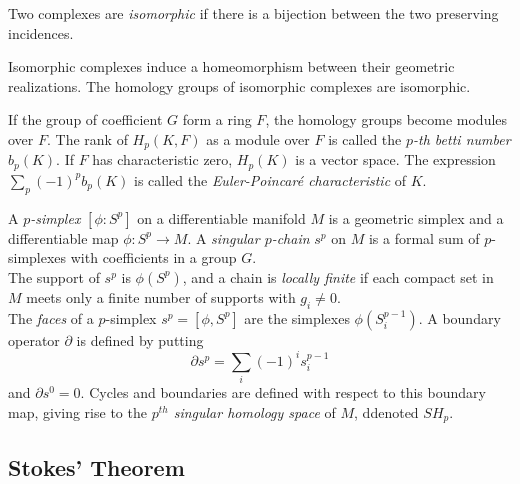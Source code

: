 \begin{defn}

Two complexes are \textit{isomorphic} if there is a bijection between the two preserving incidences.

\end{defn}

\begin{prop}

Isomorphic complexes induce a homeomorphism between their geometric realizations. The homology groups of isomorphic complexes are isomorphic.

\end{prop}

\begin{defn}

	If the group of coefficient $G$ form a ring $F$, the homology groups become modules over $F$. The rank of $H_p(K,F)$ as a module over $F$ is called the \textit{$p$-th betti number} $b_p(K)$. If $F$ has characteristic zero, $H_p(K)$ is a vector space. The expression $\sum_p (-1)^p b_p(K)$ is called the \textit{Euler-Poincar\'e characteristic} of $K$.

\end{defn}

\begin{defn}

A \textit{$p$-simplex} $ \left[ \phi: S^p \right]$ on a differentiable manifold $M$ is a geometric simplex and a differentiable map $ \phi: S^p \to M$. A \textit{singular $p$-chain} $s^p$ on $M$ is a formal sum of $p$-simplexes with coefficients in a group $G$. \\
The support of $s^p$ is $ \phi \left( S^p \right)$, and a chain is \textit{locally finite} if each compact set in $M$ meets only a finite number of supports with $g_i \neq 0$. \\
The \textit{faces} of a $p$-simplex $s^p = \left[ \phi,S^p \right]$ are the simplexes $ \phi \left( S^{ p-1 }_i \right)$. A boundary operator $ \partial$ is defined by putting
\[
	\partial s^p = \sum_i (-1)^i s^{ p-1 }_i
\]
and $ \partial s^0 = 0$. Cycles and boundaries are defined with respect to this boundary map, giving rise to the \textit{$p^{ th }$ singular homology space} of $M$, ddenoted $SH_p$.

\end{defn}

\subsection{Stokes' Theorem}































